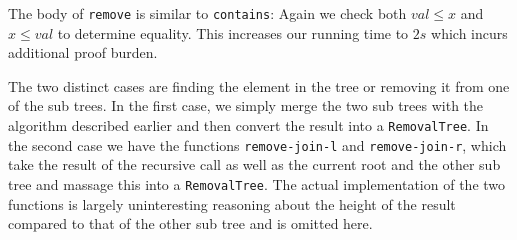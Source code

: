 The body of \texttt{remove} is similar to \texttt{contains}: Again we check both $val \leq x$ and $x \leq val$ to determine equality. This increases our running time to $2s$ which incurs additional proof burden.

The two distinct cases are finding the element in the tree or removing it from one of the sub trees. In the first case, we simply merge the two sub trees with the algorithm described earlier and then convert the result into a \texttt{RemovalTree}. In the second case we have the functions \texttt{remove-join-l} and \texttt{remove-join-r}, which take the result of the recursive call as well as the current root and the other sub tree and massage this into a \texttt{RemovalTree}. The actual implementation of the two functions is largely uninteresting reasoning about the height of the result compared to that of the other sub tree and is omitted here.